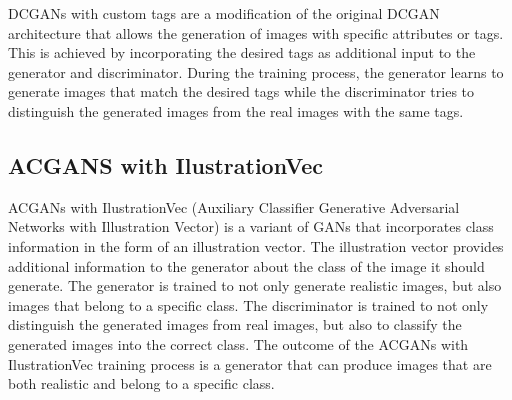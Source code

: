 \documentclass{article}
\theoremstyle{mytheoremstyle}
\theoremstyle{mytheoremstyle}
\theoremstyle{myproblemstyle}
\begin{document}
    DCGANs with custom tags are a modification of the original DCGAN architecture that allows the generation of images with specific attributes or tags. This is achieved by incorporating the desired tags as additional input to the generator and discriminator. During the training process, the generator learns to generate images that match the desired tags while the discriminator tries to distinguish the generated images from the real images with the same tags.

    \subsection{ACGANS with IlustrationVec}

    ACGANs with IlustrationVec (Auxiliary Classifier Generative Adversarial Networks with Illustration Vector) is a variant of GANs that incorporates class information in the form of an illustration vector. The illustration vector provides additional information to the generator about the class of the image it should generate. The generator is trained to not only generate realistic images, but also images that belong to a specific class. The discriminator is trained to not only distinguish the generated images from real images, but also to classify the generated images into the correct class. The outcome of the ACGANs with IlustrationVec training process is a generator that can produce images that are both realistic and belong to a specific class.
\end{document}
